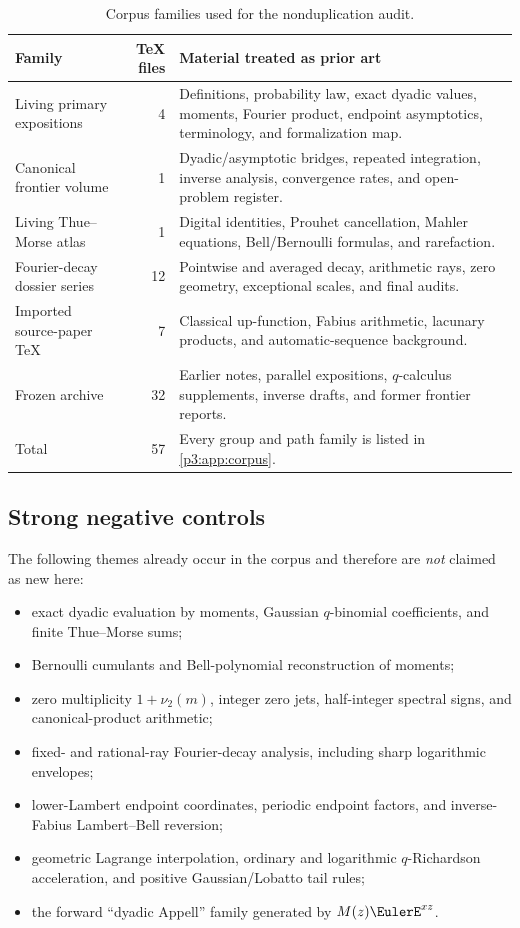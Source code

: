 \documentclass[11pt,oneside]{article}
\numberwithin{equation}{section}
\theoremstyle{definition}
\theoremstyle{remark}
\begin{document}
\begin{table}[H]
\centering
\caption{Corpus families used for the nonduplication audit.}
\label{p3:tab:corpus-summary}
\begin{tabularx}{\textwidth}{@{}l r X@{}}
\toprule
Family & TeX files & Material treated as prior art \\
\midrule
Living primary expositions & 4 & Definitions, probability law, exact dyadic values, moments, Fourier product, endpoint asymptotics, terminology, and formalization map.\\
Canonical frontier volume & 1 & Dyadic/asymptotic bridges, repeated integration, inverse analysis, convergence rates, and open-problem register.\\
Living Thue--Morse atlas & 1 & Digital identities, Prouhet cancellation, Mahler equations, Bell/Bernoulli formulas, and rarefaction.\\
Fourier-decay dossier series & 12 & Pointwise and averaged decay, arithmetic rays, zero geometry, exceptional scales, and final audits.\\
Imported source-paper TeX & 7 & Classical up-function, Fabius arithmetic, lacunary products, and automatic-sequence background.\\
Frozen archive & 32 & Earlier notes, parallel expositions, $q$-calculus supplements, inverse drafts, and former frontier reports.\\
\midrule
Total & 57 & Every group and path family is listed in \cref{p3:app:corpus}.\\
\bottomrule
\end{tabularx}
\end{table}

\subsection{Strong negative controls}

The following themes already occur in the corpus and therefore are \emph{not} claimed as new here:
\begin{itemize}
\item exact dyadic evaluation by moments, Gaussian $q$-binomial coefficients, and finite Thue--Morse sums;
\item Bernoulli cumulants and Bell-polynomial reconstruction of moments;
\item zero multiplicity $1+\nu_2(m)$, integer zero jets, half-integer spectral signs, and canonical-product arithmetic;
\item fixed- and rational-ray Fourier-decay analysis, including sharp logarithmic envelopes;
\item lower-Lambert endpoint coordinates, periodic endpoint factors, and inverse-Fabius Lambert--Bell reversion;
\item geometric Lagrange interpolation, ordinary and logarithmic $q$-Richardson acceleration, and positive Gaussian/Lobatto tail rules;
\item the forward ``dyadic Appell'' family generated by $M(z)\EulerE^{xz}$.
\end{itemize}
\end{document}
